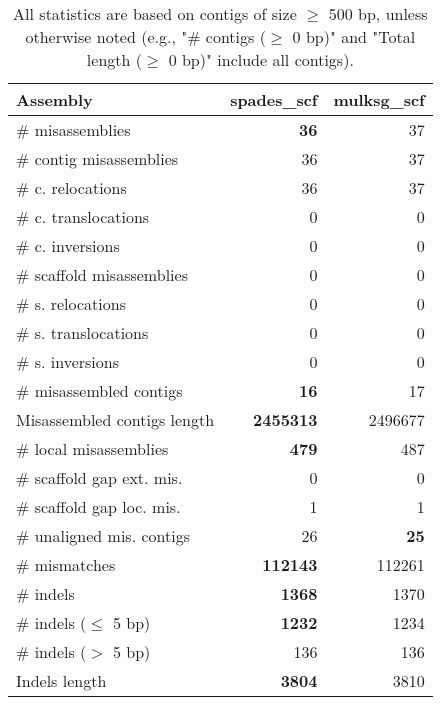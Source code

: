 \documentclass[12pt,a4paper]{article}
\begin{document}
\begin{table}[ht]
\begin{center}
\caption{All statistics are based on contigs of size $\geq$ 500 bp, unless otherwise noted (e.g., "\# contigs ($\geq$ 0 bp)" and "Total length ($\geq$ 0 bp)" include all contigs).}
\begin{tabular}{|l*{2}{|r}|}
\hline
Assembly & spades\_scf & mulksg\_scf \\ \hline
\# misassemblies & {\bf 36} & 37 \\ \hline
\hspace{2mm}\# contig misassemblies & 36 & 37 \\ \hline
\hspace{5mm}\# c. relocations & 36 & 37 \\ \hline
\hspace{5mm}\# c. translocations & 0 & 0 \\ \hline
\hspace{5mm}\# c. inversions & 0 & 0 \\ \hline
\hspace{2mm}\# scaffold misassemblies & 0 & 0 \\ \hline
\hspace{5mm}\# s. relocations & 0 & 0 \\ \hline
\hspace{5mm}\# s. translocations & 0 & 0 \\ \hline
\hspace{5mm}\# s. inversions & 0 & 0 \\ \hline
\# misassembled contigs & {\bf 16} & 17 \\ \hline
Misassembled contigs length & {\bf 2455313} & 2496677 \\ \hline
\# local misassemblies & {\bf 479} & 487 \\ \hline
\# scaffold gap ext. mis. & 0 & 0 \\ \hline
\# scaffold gap loc. mis. & 1 & 1 \\ \hline
\# unaligned mis. contigs & 26 & {\bf 25} \\ \hline
\# mismatches & {\bf 112143} & 112261 \\ \hline
\# indels & {\bf 1368} & 1370 \\ \hline
\hspace{5mm}\# indels ($\leq$ 5 bp) & {\bf 1232} & 1234 \\ \hline
\hspace{5mm}\# indels ($>$ 5 bp) & 136 & 136 \\ \hline
Indels length & {\bf 3804} & 3810 \\ \hline
\end{tabular}
\end{center}
\end{table}
\end{document}
